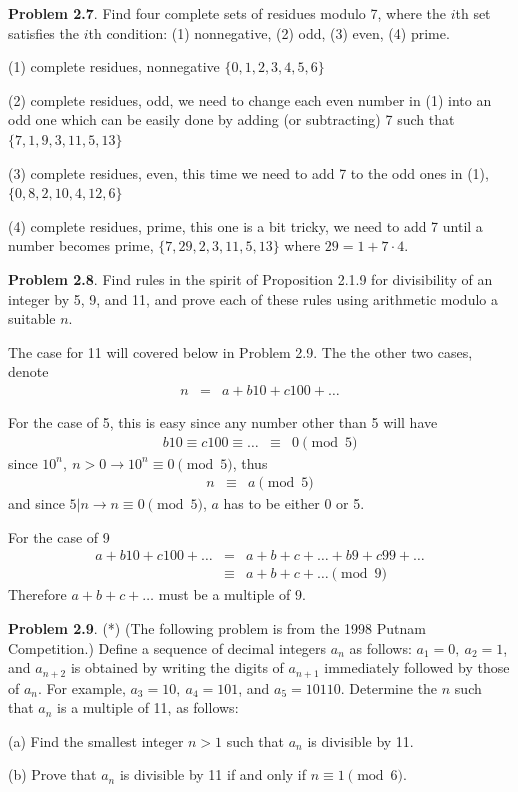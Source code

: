 \documentclass[aps,preprint,preprintnumbers,nofootinbib,showpacs,prd]{revtex4-1}
\newcommand{\nbea}{\begin{eqnarray*}}
\newcommand{\neea}{\end{eqnarray*}}
\begin{document}
{\bf Problem 2.7}. Find four complete sets of residues modulo 7, where the $i$th set satisfies the $i$th condition: (1) nonnegative, (2) odd, (3) even, (4) prime.

(1) complete residues, nonnegative $\{0,1,2,3,4,5,6\}$

(2) complete residues, odd, we need to change each even number in (1) into an odd one which can be easily done by adding (or subtracting) 7 such that $\{7,1,9,3,11,5,13\}$

(3) complete residues, even, this time we need to add 7 to the odd ones in (1), $\{0,8,2,10,4,12,6\}$

(4) complete residues, prime, this one is a bit tricky, we need to add 7 until a number becomes prime, $\{7,29,2,3,11,5,13\}$ where $29 = 1 + 7\cdot 4$.

{\bf Problem 2.8}. Find rules in the spirit of Proposition 2.1.9 for divisibility of an integer by 5, 9, and 11, and prove each of these rules using arithmetic modulo a suitable $n$.

The case for 11 will covered below in Problem 2.9. The the other two cases, denote
%
\nbea
n & = & a + b10 + c100 + \dots
\neea
%

For the case of 5, this is easy since any number other than 5 will have 
%
\nbea
b10 \equiv c100 \equiv \dots & \equiv & 0 \pmod{5}
\neea
%
since $10^n,~n > 0 \to 10^n \equiv 0 \pmod{5}$, thus
%
\nbea
n & \equiv & a \pmod{5}
\neea
%
and since $5|n \to n \equiv 0 \pmod{5}$, $a$ has to be either 0 or 5.

For the case of 9
%
\nbea
a + b10 + c100 + \dots & = & a + b + c + \dots + b9 + c99 + \dots \\
& \equiv & a + b + c + \dots \pmod{9}
\neea
%
Therefore $a + b + c + \dots$ must be a multiple of 9.

{\bf Problem 2.9}. (*) (The following problem is from the 1998 Putnam Competition.) Define a sequence of decimal integers $a_n$ as follows: $a_1 = 0,~ a_2 = 1$, and $a_{n+2}$ is obtained by writing the digits of $a_{n+1}$ immediately followed by those of $a_n$. For example, $a_3 = 10,~ a_4 = 101$, and $a_5 = 10110$. Determine the $n$ such that $a_n$ is a multiple of 11, as follows:

(a) Find the smallest integer $n > 1$ such that $a_n$ is divisible by 11.

(b) Prove that $a_n$ is divisible by 11 if and only if $n \equiv 1 \pmod{6}$.
\end{document}
